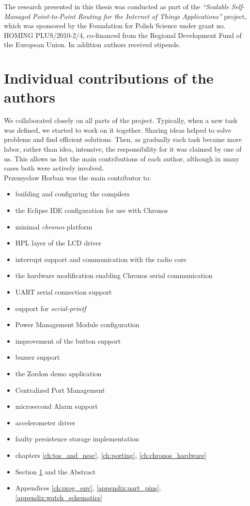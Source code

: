 The research presented in this thesis was conducted as part of the {\it``Scalable Self-Managed Point-to-Point Routing for the Internet of Things Applications''} project, which was sponsored by the Foundation for Polish Science under grant no. HOMING PLUS/2010-2/4, co-financed from the Regional Development Fund of the European Union. In addition authors received stipends.

\section{Individual contributions of the authors}
\label{ch:contributions}

We collaborated closely on all parts of the project. Typically, when a new task was defined, we started to work on it together. Sharing ideas helped to solve problems and find efficient solutions. Then, as gradually each task became more labor, rather than idea, intensive, the responsibility for it was claimed by one of us. This allows us list the main contributions of each author, although in many cases both were actively involved.\\
Przemysław Horban was the main contributor to:
\begin{itemize}\addtolength{\itemsep}{-.35\baselineskip} 
  \item building and configuring the compilers
  \item the Eclipse IDE configuration for use with Chronos
  \item minimal \emph{chronos} platform
  \item HPL layer of the LCD driver
  \item interrupt support and communication with the radio core
  \item the hardware modification enabling Chronos serial communication
  \item UART serial connection support
  \item support for \emph{serial-printf}
  \item Power Management Module configuration
  \item improvement of the button support
  \item buzzer support
  \item the Zordon demo application
  \item Centralized Port Management
  \item microsecond Alarm support
  \item accelerometer driver
  \item faulty persistence storage implementation
  \item chapters \ref{ch:tos_and_nesc}, \ref{ch:porting}, \ref{ch:chronos_hardware}
  \item Section \ref{ch:contributions} and the Abstract
  \item Appendices \ref{ch:prog_env}, \ref{appendix:uart_pins}, \ref{appendix:watch_schematics}
\end{itemize}
